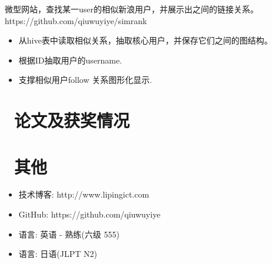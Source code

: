 \documentclass{resume}
\begin{document}
\begin{onehalfspacing}
微型网站，查找某一user的相似新浪用户，并展示出之间的链接关系。https://github.com/qiuwuyiye/simrank
\begin{itemize}
  \item 从hive表中读取相似关系，抽取核心用户，并保存它们之间的图结构。
  \item 根据ID抽取用户的username.
  \item 支撑相似用户follow 关系图形化显示.
\end{itemize}
\end{onehalfspacing}



\section{\faHeartO\ 论文及获奖情况}

\section{\faInfo\ 其他}
\begin{itemize}[parsep=0.5ex]
  \item 技术博客: http://www.lipingict.com
  \item GitHub: https://github.com/qiuwuyiye
  \item 语言: 英语 - 熟练(六级 555)
  \item 语言: 日语(JLPT N2)
\end{itemize}

%
%
\end{document}
